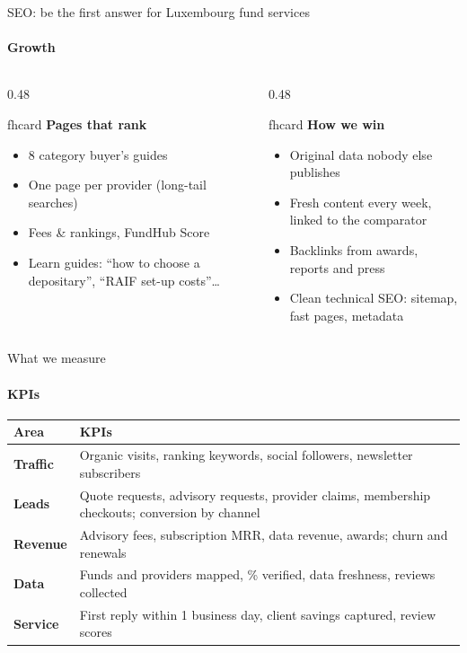 \documentclass[aspectratio=169,10pt]{beamer}
\newcommand{\fhcard}[2]{%
  \begin{beamercolorbox}[wd=\linewidth,sep=7pt,rounded=true]{fhcard}
    {\small\bfseries\color{fhEmeraldDark}#1}\par\vspace{2pt}\footnotesize #2
  \end{beamercolorbox}}
\begin{document}
\begin{frame}{SEO: be the first answer for Luxembourg fund services}
  \framesubtitle{Growth}
  \begin{columns}[T]
    \begin{column}{0.48\textwidth}
      \fhcard{Pages that rank}{\begin{itemize}\small
        \item 8 category buyer's guides
        \item One page per provider (long-tail searches)
        \item Fees \& rankings, FundHub Score
        \item Learn guides: ``how to choose a depositary'', ``RAIF set-up costs''\ldots
      \end{itemize}}
    \end{column}
    \begin{column}{0.48\textwidth}
      \fhcard{How we win}{\begin{itemize}\small
        \item Original data nobody else publishes
        \item Fresh content every week, linked to the comparator
        \item Backlinks from awards, reports and press
        \item Clean technical SEO: sitemap, fast pages, metadata
      \end{itemize}}
    \end{column}
  \end{columns}
\end{frame}

\begin{frame}{What we measure}
  \framesubtitle{KPIs}
  \small
  \begin{tabularx}{\textwidth}{@{}>{\bfseries}l X@{}}
    \toprule
    Area & KPIs \\
    \midrule
    Traffic & Organic visits, ranking keywords, social followers, newsletter subscribers \\
    Leads & Quote requests, advisory requests, provider claims, membership checkouts; conversion by channel \\
    Revenue & Advisory fees, subscription MRR, data revenue, awards; churn and renewals \\
    Data & Funds and providers mapped, \% verified, data freshness, reviews collected \\
    Service & First reply within 1 business day, client savings captured, review scores \\
    \bottomrule
  \end{tabularx}
\end{frame}
\end{document}
